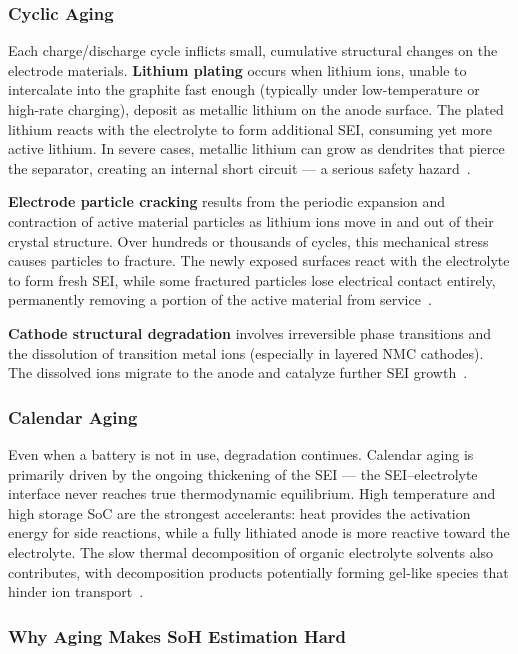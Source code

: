 \subsubsection*{Cyclic Aging}

Each charge/discharge cycle inflicts small, cumulative structural changes on the electrode materials. \textbf{Lithium plating} occurs when lithium ions, unable to intercalate into the graphite fast enough (typically under low-temperature or high-rate charging), deposit as metallic lithium on the anode surface. The plated lithium reacts with the electrolyte to form additional SEI, consuming yet more active lithium. In severe cases, metallic lithium can grow as dendrites that pierce the separator, creating an internal short circuit --- a serious safety hazard~\autocite{palacin2016}.

\textbf{Electrode particle cracking} results from the periodic expansion and contraction of active material particles as lithium ions move in and out of their crystal structure. Over hundreds or thousands of cycles, this mechanical stress causes particles to fracture. The newly exposed surfaces react with the electrolyte to form fresh SEI, while some fractured particles lose electrical contact entirely, permanently removing a portion of the active material from service~\autocite{palacin2016}.

\textbf{Cathode structural degradation} involves irreversible phase transitions and the dissolution of transition metal ions (especially in layered NMC cathodes). The dissolved ions migrate to the anode and catalyze further SEI growth~\autocite{palacin2016}.

\subsubsection*{Calendar Aging}

Even when a battery is not in use, degradation continues. Calendar aging is primarily driven by the ongoing thickening of the SEI --- the SEI--electrolyte interface never reaches true thermodynamic equilibrium. High temperature and high storage SoC are the strongest accelerants: heat provides the activation energy for side reactions, while a fully lithiated anode is more reactive toward the electrolyte. The slow thermal decomposition of organic electrolyte solvents also contributes, with decomposition products potentially forming gel-like species that hinder ion transport~\autocite{palacin2016}.

\subsubsection*{Why Aging Makes SoH Estimation Hard}

